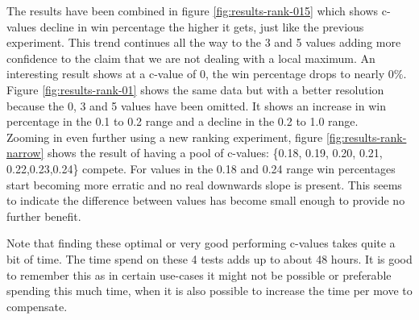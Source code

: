 \documentclass[
11pt, %
english, %
singlespacing, %
headsepline, %
]{MastersDoctoralThesis} %
\begin{document}
The results have been combined in figure \ref{fig:results-rank-015} which shows c-values decline in win percentage the higher it gets, just like the previous experiment. This trend continues all the way to the 3 and 5 values adding more confidence to the claim that we are not dealing with a local maximum. An interesting result shows at a c-value of 0, the win percentage drops to nearly $0\%$.
Figure \ref{fig:results-rank-01} shows the same data but with a better resolution because the 0, 3 and 5 values have been omitted. It shows an increase in win percentage in the 0.1 to 0.2 range and a decline in the 0.2 to 1.0 range.\\

Zooming in even further using a new ranking experiment, figure \ref{fig:results-rank-narrow} shows the result of having a pool of c-values: \{0.18, 0.19, 0.20, 0.21, 0.22,0.23,0.24\} compete. For values in the 0.18 and 0.24 range win percentages start becoming more erratic and no real downwards slope is present. This seems to indicate the difference between values has become small enough to provide no further benefit.

Note that finding these optimal or very good performing c-values takes quite a bit of time. The time spend on these 4 tests adds up to about 48 hours. It is good to remember this as in certain use-cases it might not be possible or preferable spending this much time, when it is also possible to increase the time per move to compensate.
\end{document}
